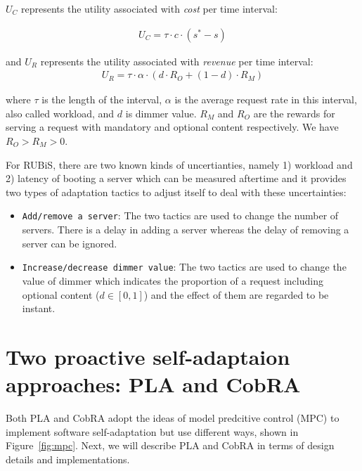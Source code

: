 \documentclass[sigconf]{acmart}
\begin{document}
	\noindent $U_{C}$ represents the utility associated with \textit{cost} per time interval:
	
	\begin{equation}
	\begin{aligned}
	U_{C}=\tau \cdot c\cdot (s^{*}-s)
	\end{aligned}
	\end{equation}
	
	\noindent and $U_{R}$ represents the utility associated with \textit{revenue} per time interval:
	\begin{equation}
	\begin{aligned}
	U_{R}=\tau \cdot \alpha \cdot (d\cdot R_{O}+(1-d)\cdot R_{M})
	\end{aligned}
	\end{equation}
	
	\noindent where $\tau$ is the length of the interval, $\alpha$ is the average request rate in this interval, also called workload, and $d$ is dimmer value. $R_{M}$ and $R_{O}$ are the rewards for serving a request with mandatory and optional content respectively. We have $R_{O}>R_{M}>0$.
	
	For RUBiS, there are two known kinds of uncertianties, namely 1) workload and 2) latency of booting a server which can be measured aftertime and it provides two types of adaptation tactics to adjust itself to deal with these uncertainties:
	\begin{itemize}
		\item {\verb|Add/remove a server|}:
		The two tactics are used to change the number of servers. There is a delay in adding a server whereas the delay of removing a server can be ignored.
		
		\item  {\verb|Increase/decrease dimmer value|}:
		The two tactics are used to change the value of dimmer which indicates the proportion of a request including optional content ($d\in[0,1]$) and the effect of them are regarded to be instant. 
	\end{itemize}
	
	\section{Two proactive self-adaptaion approaches: PLA and CobRA}
	Both PLA and CobRA adopt the ideas of model predcitive control (MPC) to implement software self-adaptation but use different ways, shown in Figure~\ref{fig:mpc}. Next, we will describe PLA and CobRA in terms of design details and implementations.
	
\end{document}
